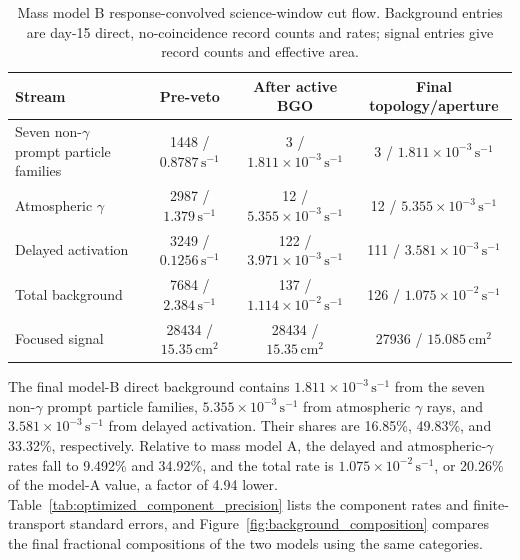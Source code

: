 \documentclass[11pt]{article}
\newcommand{\cps}{\ensuremath{\,\mathrm{s^{-1}}}}
\begin{document}
\begin{table}[H]
\centering
\caption{Mass model B response-convolved science-window cut flow. Background entries are day-15 direct, no-coincidence record counts and rates; signal entries give record counts and effective area.}
\label{tab:optimized_cutflow}
\footnotesize
\begin{tabular}{lccc}
\toprule
Stream & Pre-veto & After active BGO & Final topology/aperture \\
\midrule
Seven non-$\gamma$ prompt particle families & 1448 / $0.8787\cps$ & 3 / $1.811\times10^{-3}\cps$ & 3 / $1.811\times10^{-3}\cps$ \\
Atmospheric $\gamma$ & 2987 / $1.379\cps$ & 12 / $5.355\times10^{-3}\cps$ & 12 / $5.355\times10^{-3}\cps$ \\
Delayed activation & 3249 / $0.1256\cps$ & 122 / $3.971\times10^{-3}\cps$ & 111 / $3.581\times10^{-3}\cps$ \\
Total background & 7684 / $2.384\cps$ & 137 / $1.114\times10^{-2}\cps$ & 126 / $1.075\times10^{-2}\cps$ \\
Focused signal & 28434 / $15.35\,\mathrm{cm^2}$ & 28434 / $15.35\,\mathrm{cm^2}$ & 27936 / $15.085\,\mathrm{cm^2}$ \\
\bottomrule
\end{tabular}
\end{table}

The final model-B direct background contains $1.811\times10^{-3}\cps$ from
the seven non-$\gamma$ prompt particle families, $5.355\times10^{-3}\cps$ from atmospheric
$\gamma$ rays, and $3.581\times10^{-3}\cps$ from delayed
activation. Their shares are 16.85\%, 49.83\%, and 33.32\%, respectively.
Relative to mass model A, the delayed and atmospheric-$\gamma$ rates fall to
9.492\% and 34.92\%, and the total rate is $1.075\times10^{-2}\cps$, or
20.26\% of the model-A value, a factor of 4.94 lower. Table~\ref{tab:optimized_component_precision}
lists the component rates and finite-transport standard errors, and
Figure~\ref{fig:background_composition} compares the final fractional
compositions of the two models using the same categories.
\end{document}
